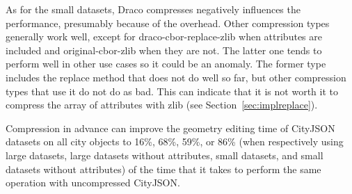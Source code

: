As for the small datasets, Draco compresses negatively influences the performance, presumably because of the overhead.
Other compression types generally work well, except for draco-cbor-replace-zlib when attributes are included and original-cbor-zlib when they are not.
The latter one tends to perform well in other use cases so it could be an anomaly.
The former type includes the replace method that does not do well so far, but other compression types that use it do not do as bad.
This can indicate that it is not worth it to compress the array of attributes with zlib (see Section~\ref{sec:implreplace}).

Compression in advance can improve the geometry editing time of CityJSON datasets on all city objects to 16\%, 68\%, 59\%, or 86\% (when respectively using large datasets, large datasets without attributes, small datasets, and small datasets without attributes) of the time that it takes to perform the same operation with uncompressed CityJSON.


